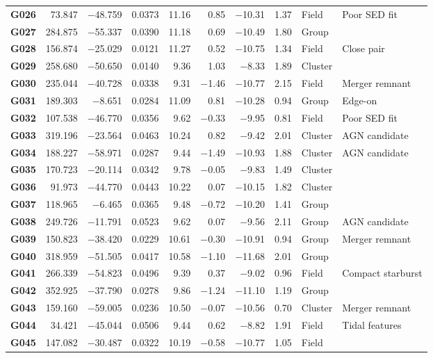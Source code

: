 \begin{landscape}
\begin{longcompact}
\begin{longtable}{l r r r r r r r l l}
\textbf{G026} & 73.847 & −48.759 & 0.0373 & 11.16 & 0.85 & −10.31 & 1.37 & Field & Poor SED fit \\
\textbf{G027} & 284.875 & −55.337 & 0.0390 & 11.18 & 0.69 & −10.49 & 1.80 & Group &  \\
\textbf{G028} & 156.874 & −25.029 & 0.0121 & 11.27 & 0.52 & −10.75 & 1.34 & Field & Close pair \\
\textbf{G029} & 258.680 & −50.650 & 0.0140 & 9.36 & 1.03 & −8.33 & 1.89 & Cluster &  \\
\textbf{G030} & 235.044 & −40.728 & 0.0338 & 9.31 & −1.46 & −10.77 & 2.15 & Field & Merger remnant \\
\textbf{G031} & 189.303 & −8.651 & 0.0284 & 11.09 & 0.81 & −10.28 & 0.94 & Group & Edge-on \\
\textbf{G032} & 107.538 & −46.770 & 0.0356 & 9.62 & −0.33 & −9.95 & 0.81 & Field & Poor SED fit \\
\textbf{G033} & 319.196 & −23.564 & 0.0463 & 10.24 & 0.82 & −9.42 & 2.01 & Cluster & AGN candidate \\
\textbf{G034} & 188.227 & −58.971 & 0.0287 & 9.44 & −1.49 & −10.93 & 1.88 & Cluster & AGN candidate \\
\textbf{G035} & 170.723 & −20.114 & 0.0342 & 9.78 & −0.05 & −9.83 & 1.49 & Cluster &  \\
\textbf{G036} & 91.973 & −44.770 & 0.0443 & 10.22 & 0.07 & −10.15 & 1.82 & Cluster &  \\
\textbf{G037} & 118.965 & −6.465 & 0.0365 & 9.48 & −0.72 & −10.20 & 1.41 & Group &  \\
\textbf{G038} & 249.726 & −11.791 & 0.0523 & 9.62 & 0.07 & −9.56 & 2.11 & Group & AGN candidate \\
\textbf{G039} & 150.823 & −38.420 & 0.0229 & 10.61 & −0.30 & −10.91 & 0.94 & Group & Merger remnant \\
\textbf{G040} & 318.959 & −51.505 & 0.0417 & 10.58 & −1.10 & −11.68 & 2.01 & Group &  \\
\textbf{G041} & 266.339 & −54.823 & 0.0496 & 9.39 & 0.37 & −9.02 & 0.96 & Field & Compact starburst \\
\textbf{G042} & 352.925 & −37.790 & 0.0278 & 9.86 & −1.24 & −11.10 & 1.19 & Group &  \\
\textbf{G043} & 159.160 & −59.005 & 0.0236 & 10.50 & −0.07 & −10.56 & 0.70 & Cluster & Merger remnant \\
\textbf{G044} & 34.421 & −45.044 & 0.0506 & 9.44 & 0.62 & −8.82 & 1.91 & Field & Tidal features \\
\textbf{G045} & 147.082 & −30.487 & 0.0322 & 10.19 & −0.58 & −10.77 & 1.05 & Field &  \\
\end{longtable}
\end{longcompact}
\end{landscape}
